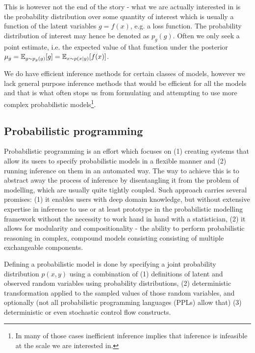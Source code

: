 \documentclass[12pt]{article}
\begin{document}
This is however not the end of the story - 
what we are actually interested in is the probability distribution over some quantity of interest which is usually a function of the latent variables $g=f(x)$, e.g. a loss function.
The probability distribution of interest may hence be denoted as $p_g(g)$.
Often we only seek a point estimate, i.e. the expected value of that function under the posterior $\mu_g=\mathbb{E}_{g \sim p_g(g)}[g]=\mathbb{E}_{x \sim p(x|y)}[f(x)]$.


We do have efficient inference methods for certain classes of models, however we lack general purpose inference methods that would be efficient for all the models and that is what often stops us from formulating and attempting to use more complex probabilistic 
models\footnote{In many of those cases inefficient inference implies that inference is infeasible at the scale we are interested in.}.

\subsection{Probabilistic programming}
Probabilistic programming is an effort which focuses on 
(1) creating systems that allow its users to specify probabilistic models in a flexible manner 
and 
(2) running inference on them in an automated way.
The way to achieve this is to abstract away the process of inference by disentangling it from the problem of modelling, which are usually quite tightly coupled.
Such approach carries several promises:
(1) it enables users with deep domain knowledge, but without extensive expertise in inference to use or at least prototype in the probabilistic modelling framework without the necessity to work hand in hand with a statistician,
(2) it allows for modularity and compositionality - the ability to perform probabilistic reasoning in complex, compound models consisting consisting of multiple exchangeable components.

Defining a probabilistic model is done by specifying a joint probability distribution $p(x,y)$ using a combination of 
(1) definitions of latent and observed random variables using probability distributions, 
(2) deterministic transformation applied to the sampled values of those random variables, 
and optionally (not all probabilistic programming languages (PPLs) allow that) 
(3) deterministic or even stochastic control flow constructs.  
\end{document}
